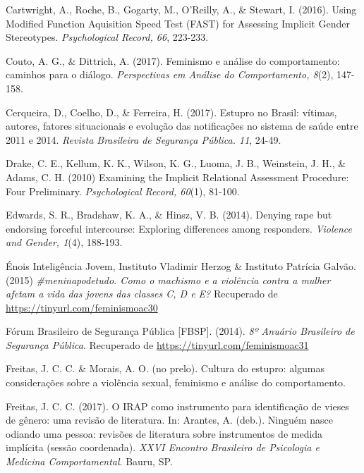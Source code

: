 \hangindent=25pt
\noindent Cartwright, A., Roche, B., Gogarty, M., O'Reilly, A., \& Stewart, I. (2016). Using Modified Function Aquisition Speed Test (FAST) for Assessing Implicit Gender Stereotypes. \textit{Psychological Record, 66}, 223-233.

\hangindent=25pt
\noindent Couto, A. G., \& Dittrich, A. (2017). Feminismo e análise do comportamento: caminhos para o diálogo. \textit{Perspectivas em Análise do Comportamento, 8}(2), 147-158.

\hangindent=25pt
\noindent Cerqueira, D., Coelho, D., \& Ferreira, H. (2017). Estupro no Brasil: vítimas, autores, fatores situacionais e evolução das notificações no sistema de saúde entre 2011 e 2014. \textit{Revista Brasileira de Segurança Pública. 11}, 24-49. 

\hangindent=25pt
\noindent Drake, C. E., Kellum, K. K., Wilson, K. G., Luoma, J. B., Weinstein, J. H., \& Adams, C. H. (2010) Examining the Implicit Relational Assessment Procedure: Four Preliminary. \textit{Psychological Record, 60}(1), 81-100.

\hangindent=25pt
\noindent Edwards, S. R., Bradshaw, K. A., \& Hinsz, V. B. (2014). Denying rape but endorsing forceful intercourse: Exploring differences among responders. \textit{Violence and Gender, 1}(4), 188-193.

\hangindent=25pt
\noindent Énois Inteligência Jovem, Instituto Vladimir Herzog \& Instituto Patrícia Galvão. (2015) \textit{\#meninapodetudo. Como o machismo e a violência contra a mulher afetam a vida das jovens das classes C, D e E?} Recuperado de \url{https://tinyurl.com/feminismoac30} 

\hangindent=25pt
\noindent Fórum Brasileiro de Segurança Pública [FBSP]. (2014). \textit{8º Anuário Brasileiro de Segurança Pública}. Recuperado de \url{https://tinyurl.com/feminismoac31}

\hangindent=25pt
\noindent Freitas, J. C. C. \& Morais, A. O. (no prelo). Cultura do estupro: algumas considerações sobre a violência sexual, feminismo e análise do comportamento.

\hangindent=25pt
\noindent Freitas, J. C. C. (2017). O IRAP como instrumento para identificação de vieses de gênero: uma revisão de literatura. In: Arantes, A. (deb.). Ninguém nasce odiando uma pessoa: revisões de literatura sobre instrumentos de medida implícita (sessão coordenada). \textit{XXVI Encontro Brasileiro de Psicologia e Medicina Comportamental}. Bauru, SP.

